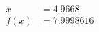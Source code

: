 \documentclass[preview]{standalone}
\begin{document}
\begin{align*}
x &= 4.9668\\f(x) &= 7.9998616
\end{align*}
\end{document}
